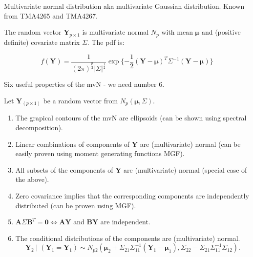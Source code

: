 \documentclass[
  ignorenonframetext,
]{beamer}
\providecommand{\tightlist}{%
  \setlength{\itemsep}{0pt}\setlength{\parskip}{0pt}}
\begin{document}
\begin{frame}
\begin{block}{Multivariate normal distribution}
\protect\hypertarget{multivariate-normal-distribution}{}
aka multivariate Gaussian distribution. Known from TMA4265 and TMA4267.

The random vector \(\mathbf{Y}_{p\times 1}\) is multivariate normal
\(N_p\) with mean \(\mathbf{\mu}\) and (positive definite) covariate
matrix \(\Sigma\). The pdf is:

\[f(\mathbf{Y})=\frac{1}{(2\pi)^\frac{p}{2}|\Sigma|^\frac{1}{2}} \exp\{-\frac{1}{2}(\mathbf{Y}-\mathbf{\mu})^T\Sigma^{-1}(\mathbf{Y}-\mathbf{\mu})\}\]

Six useful properties of the mvN - we need number 6.

Let \(\mathbf{Y}_{(p\times 1)}\) be a random vector from
\(N_p(\mathbf{\mu},\Sigma)\).

\begin{enumerate}
\tightlist
\item
  The grapical contours of the mvN are ellipsoids (can be shown using
  spectral decomposition).
\item
  Linear combinations of components of \(\mathbf{Y}\) are (multivariate)
  normal (can be easily proven using moment generating functions MGF).
\item
  All subsets of the components of \(\mathbf{Y}\) are (multivariate)
  normal (special case of the above).
\end{enumerate}
\end{block}
\end{frame}

\begin{frame}
\begin{enumerate}
\setcounter{enumi}{3}
\tightlist
\item
  Zero covariance implies that the corresponding components are
  independently distributed (can be proven using MGF).
\item
  \(\mathbf{A}\Sigma\mathbf{B}^T=\mathbf{0} \Leftrightarrow \mathbf{A}\mathbf{Y}\)
  and \(\mathbf{B}\mathbf{Y}\) are independent.
\item
  The conditional distributions of the components are (multivariate)
  normal.
  \[\mathbf{Y}_2 \mid (\mathbf{Y}_1=\mathbf{Y}_1) \sim N_{p2}(\mathbf{\mu}_2+               \Sigma_{21}\Sigma_{11}^{-1} (\mathbf{Y}_1-\mathbf{\mu}_1),\Sigma_{22}-\Sigma_{21}\Sigma_{11}^{-1}\Sigma_{12}).\]
\end{enumerate}
\end{frame}
\end{document}
